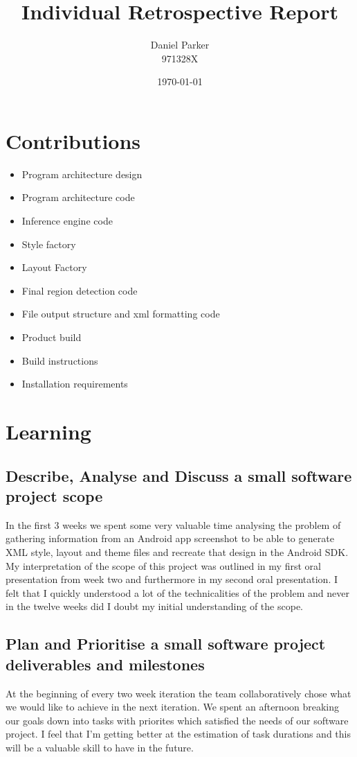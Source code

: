 \documentclass{article}
\title{Individual Retrospective Report}
\author{Daniel Parker \\ 971328X}
\date{\today}
\begin{document}
\maketitle

\section{Contributions}
\begin{itemize}
	\item{Program architecture design}
	\item{Program architecture code}
	\item{Inference engine code}
	\item{Style factory}
	\item{Layout Factory}
	\item{Final region detection code}
	\item{File output structure and xml formatting code}
	\item{Product build}
	\item{Build instructions}
	\item{Installation requirements}
\end{itemize}

\maketitle
\section{Learning}
\subsection{Describe, Analyse and Discuss a small software project scope}
In the first 3 weeks we spent some very valuable time analysing the problem of gathering information from an Android app screenshot to be able to generate XML style, layout and theme files and recreate that design in the Android SDK. My interpretation of the scope of this project was outlined in my first oral presentation from week two and furthermore in my second oral presentation. I felt that I quickly understood a lot of the technicalities of the problem and never in the twelve weeks did I doubt my initial understanding of the scope.

\subsection{Plan and Prioritise a small software project deliverables and milestones}
At the beginning of every two week iteration the team collaboratively chose what we would like to achieve in the next iteration. We spent an afternoon breaking our goals down into tasks with priorites which satisfied the needs of our software project. I feel that I'm getting better at the estimation of task durations and this will be a valuable skill to have in the future.
\end{document}
